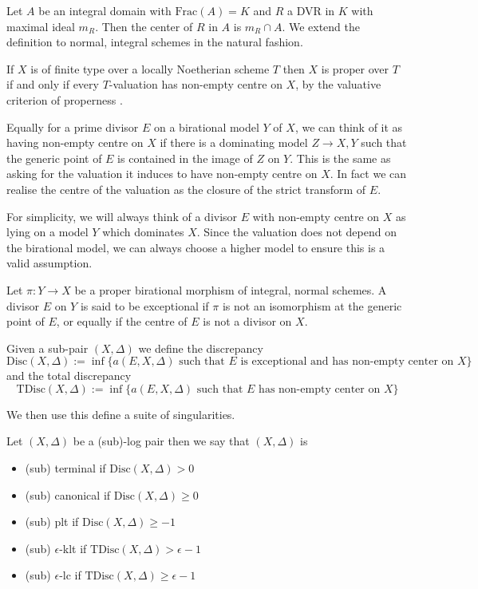 \begin{definition}
	Let $A$ be an integral domain with $\text{Frac}(A)=K$ and $R$ a DVR in $K$ with maximal ideal $m_{R}$. Then the center of $R$ in $A$ is $m_{R}\cap A$. We extend the definition to normal, integral schemes in the natural fashion.
\end{definition}

If $X$ is of finite type over a locally Noetherian scheme $T$ then $X$ is proper over $T$ if and only if every $T$-valuation has non-empty centre on $X$, by the valuative criterion of properness \cite[Tag 0208]{stacks-project}. 

Equally for a prime divisor $E$ on a birational model $Y$ of $X$, we can think of it as having non-empty centre on $X$ if there is a dominating model $Z \to X,Y$ such that the generic point of $E$ is contained in the image of $Z$ on $Y$. This is the same as asking for the valuation it induces to have non-empty centre on $X$. In fact we can realise the centre of the valuation as the closure of the strict transform of $E$.

For simplicity, we will always think of a divisor $E$ with non-empty centre on $X$ as lying on a model $Y$ which dominates $X$. Since the valuation does not depend on the birational model, we can always choose a higher model to ensure this is a valid assumption. 

\begin{definition}
	
	Let $\pi\colon Y \to X$ be a proper birational morphism of integral, normal schemes. A divisor $E$ on $Y$ is said to be exceptional if $\pi$ is not an isomorphism at the generic point of $E$, or equally if the centre of $E$ is not a divisor on $X$.
	
	Given a sub-pair $(X,\Delta)$ we define the discrepancy $$\text{Disc}(X,\Delta):=\inf \{a(E,X,\Delta) \text{ such that } E \text{ is exceptional and has non-empty center on } X\}$$
	and the total discrepancy 
	$$\text{TDisc}(X,\Delta):=\inf \{a(E,X,\Delta) \text { such that } E \text{ has non-empty center on } X\}$$
\end{definition}

We then use this define a suite of singularities.

\begin{definition}
	Let $(X,\Delta)$ be a (sub)-log pair then we say that $(X,\Delta)$ is
	\begin{itemize}
	\item 	(sub) terminal if $\text{Disc}(X,\Delta) > 0$
	\item	(sub) canonical if $\text{Disc}(X,\Delta)\geq 0$
	\item 	(sub) plt if $\text{Disc}(X,\Delta)\geq -1$
	\item	(sub) $\epsilon$-klt if $\text{TDisc}(X,\Delta) > \epsilon-1$
	\item	(sub) $\epsilon$-lc if $\text{TDisc}(X,\Delta) \geq \epsilon -1$
	\end{itemize}
\end{definition}

